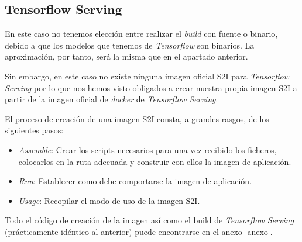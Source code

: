 \subsection{Tensorflow Serving}

En este caso no tenemos elección entre realizar el \textit{build} con fuente o binario, debido a que los modelos que tenemos de \textit{Tensorflow} son binarios. La aproximación, por tanto, será la misma que en el apartado anterior. 

Sin embargo, en este caso no existe ninguna imagen oficial S2I para \textit{Tensorflow Serving} por lo que nos hemos visto obligados a crear nuestra propia imagen S2I a partir de la imagen oficial de \textit{docker} de \textit{Tensorflow Serving}.

El proceso de creación de una imagen S2I consta, a grandes rasgos, de los siguientes pasos: 

\begin{itemize}
\item \textit{Assemble}: Crear los scripts necesarios para una vez recibido los ficheros, colocarlos en la ruta adecuada y construir con ellos la imagen de aplicación. 
\item \textit{Run}: Establecer como debe comportarse la imagen de aplicación.
\item \textit{Usage}: Recopilar el modo de uso de la imagen S2I. 

\end{itemize}

Todo el código de creación de la imagen así como el build de \textit{Tensorflow Serving} (prácticamente idéntico al anterior) puede encontrarse en el anexo \ref{anexo}.



